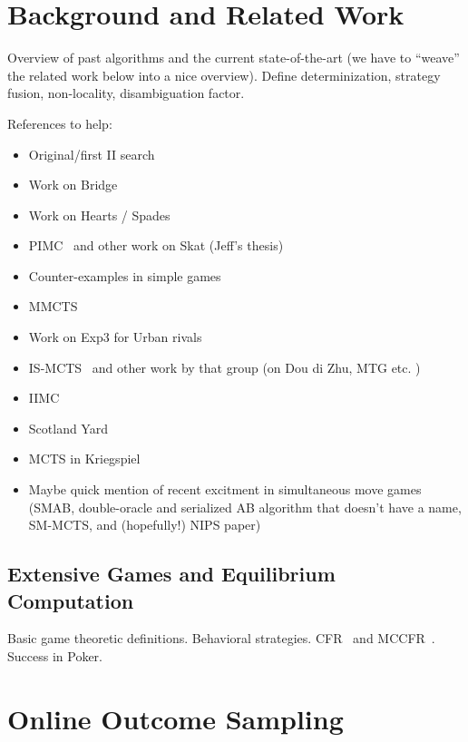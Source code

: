 \documentclass[letterpaper]{article}
\begin{document}
\section{Background and Related Work}

Overview of past algorithms and the current state-of-the-art (we have to ``weave'' the related work below into a nice overview).
Define determinization, strategy fusion, non-locality, disambiguation factor. 

References to help:
\begin{itemize}
\item Original/first II search~\cite{Frank98Finding}
\item Work on Bridge~\cite{Ginsberg01}
\item Work on Hearts / Spades~\cite{Sturtevant08An}
\item PIMC~\cite{long2010understanding} and other work on Skat (Jeff's thesis)
\item Counter-examples in simple games~\cite{Shafiei09,Ponsen11Computing} 
\item MMCTS~\cite{Auger11Multiple}
\item Work on Exp3 for Urban rivals~\cite{Teytaud11Upper,StPierre12Online}
\item IS-MCTS~\cite{Cowling12ISMCTS} and other work by that group (on Dou di Zhu, MTG etc. \cite{Whitehouse11DDZ,Cowling12MTG})
\item IIMC~\cite{Furtak13Recursive}
\item Scotland Yard~\cite{Nijssen12SY}
\item MCTS in Kriegspiel~\cite{Ciancarini09Kriegspiel}
\item Maybe quick mention of recent excitment in simultaneous move games (SMAB, double-oracle and serialized AB algorithm that doesn't have a name, SM-MCTS, and (hopefully!) NIPS paper)
\end{itemize}

\subsection{Extensive Games and Equilibrium Computation}

Basic game theoretic definitions. Behavioral strategies. 
CFR~\cite{CFR} and MCCFR~\cite{Lanctot09Sampling}. Success in Poker.

\section{Online Outcome Sampling}
\end{document}

